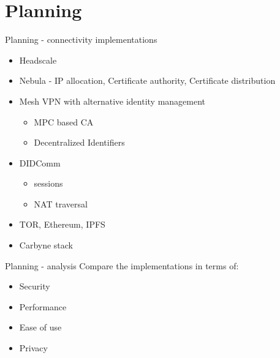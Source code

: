 \begin{frame}{}
\protect\hypertarget{section}{}
\section{Planning}
\end{frame}

\begin{frame}{Planning - connectivity implementations}
\protect\hypertarget{planning---connectivity-implementations}{}
\begin{itemize}
\tightlist
\item
  Headscale
\item
  Nebula - IP allocation, Certificate authority, Certificate
  distribution
\item
  Mesh VPN with alternative identity management

  \begin{itemize}
  \tightlist
  \item
    MPC based CA
  \item
    Decentralized Identifiers
  \end{itemize}
\item
  DIDComm

  \begin{itemize}
  \tightlist
  \item
    sessions
  \item
    NAT traversal
  \end{itemize}
\item
  TOR, Ethereum, IPFS
\item
  Carbyne stack
\end{itemize}
\end{frame}

\begin{frame}{Planning - analysis}
\protect\hypertarget{planning---analysis}{}
Compare the implementations in terms of:

\begin{itemize}
\tightlist
\item
  Security
\item
  Performance
\item
  Ease of use
\item
  Privacy
\end{itemize}
\end{frame}
